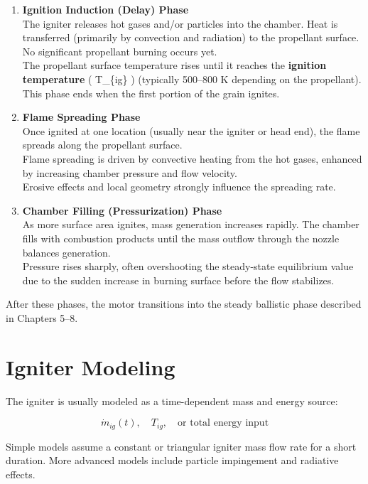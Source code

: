 \documentclass[
  letterpaper,
  DIV=11,
  numbers=noendperiod]{scrreprt}
\begin{document}
\begin{enumerate}
\def\labelenumi{\arabic{enumi}.}
\item
  \textbf{Ignition Induction (Delay) Phase}\\
  The igniter releases hot gases and/or particles into the chamber. Heat
  is transferred (primarily by convection and radiation) to the
  propellant surface. No significant propellant burning occurs yet.\\
  The propellant surface temperature rises until it reaches the
  \textbf{ignition temperature} ( T\_\{ig\} ) (typically 500--800 K
  depending on the propellant).\\
  This phase ends when the first portion of the grain ignites.
\item
  \textbf{Flame Spreading Phase}\\
  Once ignited at one location (usually near the igniter or head end),
  the flame spreads along the propellant surface.\\
  Flame spreading is driven by convective heating from the hot gases,
  enhanced by increasing chamber pressure and flow velocity.\\
  Erosive effects and local geometry strongly influence the spreading
  rate.
\item
  \textbf{Chamber Filling (Pressurization) Phase}\\
  As more surface area ignites, mass generation increases rapidly. The
  chamber fills with combustion products until the mass outflow through
  the nozzle balances generation.\\
  Pressure rises sharply, often overshooting the steady-state
  equilibrium value due to the sudden increase in burning surface before
  the flow stabilizes.
\end{enumerate}

After these phases, the motor transitions into the steady ballistic
phase described in Chapters 5--8.

\section{Igniter Modeling}\label{igniter-modeling}

The igniter is usually modeled as a time-dependent mass and energy
source:

\[
\dot{m}_{ig}(t), \quad T_{ig}, \quad \text{or total energy input}
\]

Simple models assume a constant or triangular igniter mass flow rate for
a short duration. More advanced models include particle impingement and
radiative effects.
\end{document}
